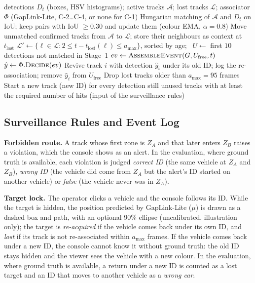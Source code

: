 \begin{algorithm}[H]
\caption{One frame of the two-stage online tracker}
\label{alg:tracker}
\begin{algorithmic}[1]
\Require detections $D_t$ (boxes, HSV histograms); active tracks $\mathcal{A}$; lost tracks $\mathcal{L}$; associator $\Phi$ (GapLink-Lite, C-2\dots C-4, or none for C-1)
\State Hungarian matching of $\mathcal{A}$ and $D_t$ on IoU; keep pairs with IoU $\ge 0.30$ and update them (colour EMA, $\alpha = 0.8$)
\State Move unmatched confirmed tracks from $\mathcal{A}$ to $\mathcal{L}$; store their neighbours as context at $t_{\text{lost}}$
\State $\mathcal{L}' \gets \{\ell \in \mathcal{L} : 2 \le t - t_{\text{lost}}(\ell) \le a_{\max}\}$, sorted by age; \ $U \gets$ first $10$ detections not matched in Stage~1
        \State $ev \gets \textsc{AssembleEvent}(G, U_{\text{free}}, t)$ 
        \State $\hat{y} \gets \Phi.\textsc{Decide}(ev)$ 
            \State Revive track $i$ with detection $\hat{y}_i$ under its old ID; log the re-association; remove $\hat{y}_i$ from $U_{\text{free}}$
        \EndFor
    \EndFor
\EndIf
\State Drop lost tracks older than $a_{\max} = 95$ frames
\State Start a new track (new ID) for every detection still unused
\State \Return tracks with at least the required number of hits (input of the surveillance rules)
\end{algorithmic}
\end{algorithm}

\subsection{Surveillance Rules and Event Log}
\label{sec:surveillance_rules}

\textbf{Forbidden route.} A track whose first zone is $Z_A$ and that later enters $Z_B$ raises a violation, which the console shows as an alert. In the evaluation, where ground truth is available, each violation is judged \emph{correct ID} (the same vehicle at $Z_A$ and $Z_B$), \emph{wrong ID} (the vehicle did come from $Z_A$ but the alert's ID started on another vehicle) or \emph{false} (the vehicle never was in $Z_A$).

\textbf{Target lock.} The operator clicks a vehicle and the console follows its ID. While the target is hidden, the position predicted by GapLink-Lite ($\mu$) is drawn as a dashed box and path, with an optional 90\% ellipse (uncalibrated, illustration only); the target is \emph{re-acquired} if the vehicle comes back under its own ID, and \emph{lost} if its track is not re-associated within $a_{\max}$ frames. If the vehicle comes back under a new ID, the console cannot know it without ground truth: the old ID stays hidden and the viewer sees the vehicle with a new colour. In the evaluation, where ground truth is available, a return under a new ID is counted as a lost target and an ID that moves to another vehicle as a \emph{wrong car}.

